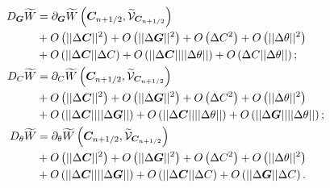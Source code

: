 \begin{equation}
\begin{aligned}
D_{\vect{G}}\widetilde{W} & = \partial_{\vect{G}}\widetilde{W}\left(\vect{C}_{n+1/2},\widetilde{\mathcal{V}}_{\vect{C}_{n+1/2}}\right)\\& + 
%
O\left(\vert\vert\Delta\vect{C}\vert\vert^2\right)+ O\left(\vert\vert\Delta\vect{G}\vert\vert^2\right)+
O\left(\Delta{C}^2\right)+
O\left(\vert\vert\Delta\theta\vert\vert^2\right)\\& + 
O\left(\vert\vert\Delta\vect{C}\vert\vert\Delta C\right) + 
O\left(\vert\vert\Delta\vect{C}\vert\vert\vert\vert\Delta\theta\vert\vert\right) 
+ 
O\left(\Delta C\vert\vert\Delta\theta\vert\vert\right);\\
%
%
%
D_{{C}}\widetilde{W} & = \partial_{{C}}\widetilde{W}\left(\vect{C}_{n+1/2},\widetilde{\mathcal{V}}_{\vect{C}_{n+1/2}}\right)\\& + 
%
O\left(\vert\vert\Delta\vect{C}\vert\vert^2\right)+ O\left(\vert\vert\Delta\vect{G}\vert\vert^2\right)+
O\left(\Delta{C}^2\right)+
O\left(\vert\vert\Delta\theta\vert\vert^2\right)\\& + 
O\left(\vert\vert\Delta\vect{C}\vert\vert\vert\vert\Delta\vect{G}\vert\vert\right) + 
O\left(\vert\vert\Delta\vect{C}\vert\vert\vert\vert\Delta\theta\vert\vert\right) 
+ 
O\left(\vert\vert\Delta\vect{G}\vert\vert\vert\vert\Delta\theta\vert\vert\right);\\
%
%
%
D_{\theta}\widetilde{W} & = \partial_{\theta}\widetilde{W}\left(\vect{C}_{n+1/2},\widetilde{\mathcal{V}}_{\vect{C}_{n+1/2}}\right)\\& + 
%
O\left(\vert\vert\Delta\vect{C}\vert\vert^2\right)+ O\left(\vert\vert\Delta\vect{G}\vert\vert^2\right)+
O\left(\Delta{C}^2\right)+
O\left(\vert\vert\Delta\theta\vert\vert^2\right)\\& + 
O\left(\vert\vert\Delta\vect{C}\vert\vert\vert\vert\Delta\vect{G}\vert\vert\right) + 
O\left(\vert\vert\Delta\vect{C}\vert\vert\Delta C\right) 
+ 
O\left(\vert\vert\Delta\vect{G}\vert\vert\Delta C\right).
%
\end{aligned}
\end{equation}